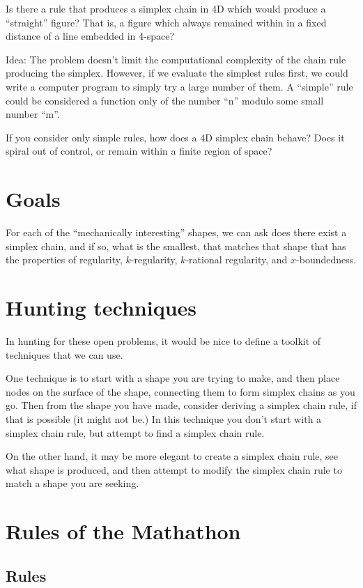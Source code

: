 \documentclass[11pt]{article}
\begin{document}
Is there a rule that produces a simplex chain in 4D which would produce a ``straight'' figure?
That is, a figure which always remained within in a fixed distance of a line embedded in 4-space?

Idea: The problem doesn't limit the computational complexity of the chain rule producing the simplex.
However, if we evaluate the simplest rules first, we could write a computer program to simply try a large number
of them. A ``simple'' rule could be considered a function only of the number ``n'' modulo some small number ``m''.

If you consider only simple rules, how does a 4D simplex chain behave? Does it spiral out of control, or remain within
a finite region of space? 


\section{Goals}

For each of the ``mechanically interesting'' shapes, we can ask does there exist a simplex chain,
and if so, what is the smallest,
that matches that shape that has the properties of regularity, $k$-regularity, $k$-rational regularity, and $x$-boundedness. 

\section{Hunting techniques}

In hunting for these open problems, it would be nice to define a toolkit of techniques that we can use.

One technique is to start with a shape you are trying to make, and then place nodes on the surface of the shape,
connecting them to form simplex chains as you go. Then from the shape you have made, consider deriving a simplex chain rule,
if that is possible (it might not be.) In this technique you don't start with a simplex chain rule, but
attempt to find a simplex chain rule.

On the other hand, it may be more elegant to create a simplex chain rule, see what shape is produced,
and then attempt to modify the simplex chain rule to match a shape you are seeking.

\section{Rules of the Mathathon}

\subsection{Rules}
\end{document}
